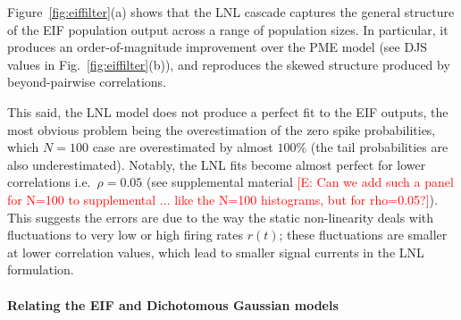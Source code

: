 \documentclass[%
 reprint,
 twocolumn,
 amsmath,amssymb,
 aps,
floatfix,
]{revtex4}
\newcommand{\Ecomment}[1]{\textcolor{red}{[E: #1]}}
\begin{document}



Figure~\ref{fig:eiffilter}(a) shows that the LNL cascade captures the general structure of the EIF population output across a range of population sizes.  In particular, it produces an order-of-magnitude improvement over the PME model (see DJS values in Fig.~\ref{fig:eiffilter}(b)), and reproduces the skewed structure produced by beyond-pairwise correlations.  

This said, the LNL model does not produce a perfect fit to the EIF outputs, the most obvious problem being the overestimation of the zero spike probabilities, which $N=100$ case are overestimated by almost $100\%$ (the tail probabilities are also underestimated).
Notably, the LNL fits become almost perfect for lower correlations i.e.~$\rho = 0.05$ (see supplemental material \Ecomment{Can we add such a panel for N=100 to supplemental ... like the N=100 histograms, but for rho=0.05?}). This suggests the errors are due to the way the static non-linearity deals with fluctuations to very low or high firing rates $r(t)$; these fluctuations are smaller at lower correlation values, which lead to smaller signal currents in the LNL formulation.  

%
%




\paragraph*{Relating the EIF and Dichotomous Gaussian models}
\end{document}
